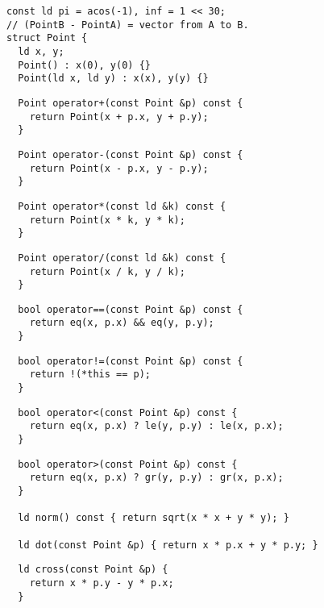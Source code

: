 \documentclass[twoside]{article}
\begin{document}
\begin{multicols*}{2}
\begin{verbatim}
const ld pi = acos(-1), inf = 1 << 30;
// (PointB - PointA) = vector from A to B.
struct Point {
  ld x, y;
  Point() : x(0), y(0) {}
  Point(ld x, ld y) : x(x), y(y) {}
  \end{verbatim}
\vspace{-12pt}
\begin{verbatim}
  Point operator+(const Point &p) const {
    return Point(x + p.x, y + p.y);
  }
  \end{verbatim}
\vspace{-12pt}
\begin{verbatim}
  Point operator-(const Point &p) const {
    return Point(x - p.x, y - p.y);
  }
  \end{verbatim}
\vspace{-12pt}
\begin{verbatim}
  Point operator*(const ld &k) const {
    return Point(x * k, y * k);
  }
  \end{verbatim}
\vspace{-12pt}
\begin{verbatim}
  Point operator/(const ld &k) const {
    return Point(x / k, y / k);
  }
  \end{verbatim}
\vspace{-12pt}
\begin{verbatim}
  bool operator==(const Point &p) const {
    return eq(x, p.x) && eq(y, p.y);
  }
  \end{verbatim}
\vspace{-12pt}
\begin{verbatim}
  bool operator!=(const Point &p) const {
    return !(*this == p);
  }
  \end{verbatim}
\vspace{-12pt}
\begin{verbatim}
  bool operator<(const Point &p) const {
    return eq(x, p.x) ? le(y, p.y) : le(x, p.x);
  }
  \end{verbatim}
\vspace{-12pt}
\begin{verbatim}
  bool operator>(const Point &p) const {
    return eq(x, p.x) ? gr(y, p.y) : gr(x, p.x);
  }

  ld norm() const { return sqrt(x * x + y * y); }

  ld dot(const Point &p) { return x * p.x + y * p.y; }
  \end{verbatim}
\vspace{-12pt}
\begin{verbatim}
  ld cross(const Point &p) {
    return x * p.y - y * p.x;
  }


\end{verbatim}
\end{multicols*}
\end{document}
